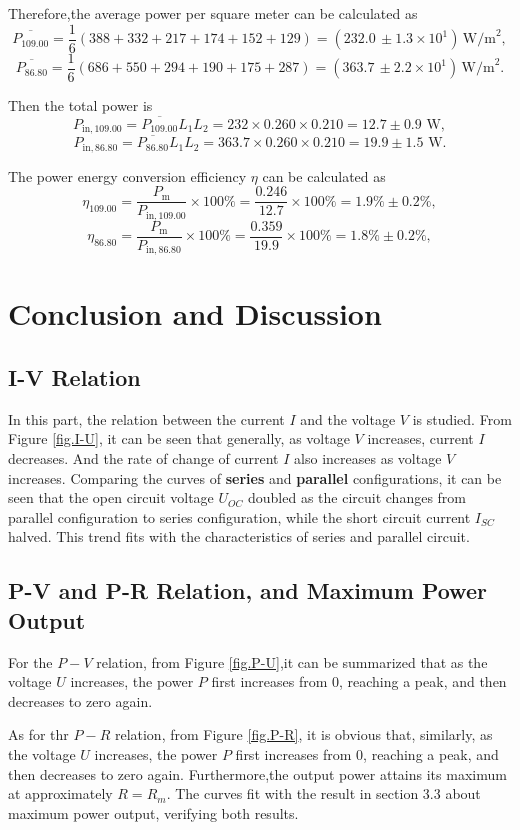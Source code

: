 \documentclass{article}
\begin{document}
{Therefore,the average power per square meter can be calculated as
$$\overline{P_{109.00}} = \frac{1}{6}(388+332+217+174+152+129) = (232.0\,\pm 1.3\times10^1)\,\text{W/m}^2,$$
$$\overline{P_{86.80}} = \frac{1}{6}(686+550+294+190+175+287) = (363.7\,\pm 2.2\times 10^1)\,\text{W/m}^2.$$

Then the total power is
$$P_{\text{in},109.00} = \overline{P_{109.00}}L_1L_2 = 232 \times 0.260 \times 0.210 = 12.7 \pm 0.9\,\,\text{W},$$
$$P_{\text{in},86.80} = \overline{P_{86.80}}L_1L_2 = 363.7 \times 0.260 \times 0.210 = 19.9\pm 1.5\,\,\text{W}.$$

The power energy conversion efficiency $\eta$ can be calculated as
$$\eta_{109.00} = \frac{P_\text{m}}{P_{\text{in},109.00}} \times 100\% = \frac{0.246}{12.7} \times 100\%= 1.9\% \pm 0.2\%,$$
$$\eta_{86.80} = \frac{P_\text{m}}{P_{\text{in},86.80}} \times 100\% = \frac{0.359}{19.9} \times 100\%= 1.8\% \pm 0.2\%,$$

\section{Conclusion and Discussion}

\subsection{I-V Relation}
In this part, the relation between the current $I$ and the voltage $V$ is studied.  From Figure \ref{fig.I-U}, it can be seen that generally, as voltage $V$ increases, current $I$ decreases. And the rate of change of current $I$ also increases as voltage $V$ increases. Comparing the curves of \textbf{series} and \textbf{parallel} configurations, it can be seen that the open circuit voltage $U_{OC}$ doubled as the circuit changes from parallel configuration to series configuration, while the short circuit current $I_{SC}$ halved. This trend fits with the characteristics of series and parallel circuit.
\subsection{P-V and P-R Relation, and Maximum Power Output}
For the $P-V$ relation, from Figure \ref{fig.P-U},it can be summarized that as the voltage $U$ increases, the power $P$ first increases from 0, reaching a peak, and then decreases to zero again. 

As for thr $P-R$ relation, from Figure \ref{fig.P-R}, it is obvious that, similarly,  as the voltage $U$ increases, the power $P$ first increases from 0, reaching a peak, and then decreases to zero again.  Furthermore,the output power attains its maximum at approximately $R = R_m$.  The curves fit with the result in section 3.3 about maximum power output, verifying both results.
}
\end{document}
